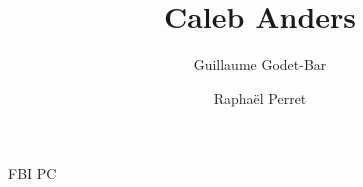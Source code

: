 \documentclass{rpg_player_character}
\title{Caleb Anders}
\begin{document}
\author{Guillaume Godet-Bar \and Rapha\"el Perret}
\maketitle

FBI PC
\end{document}
